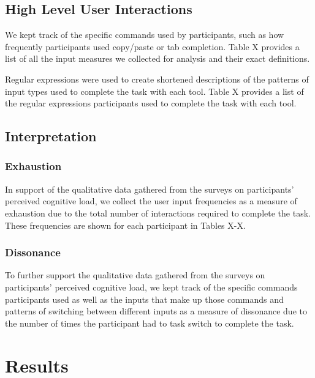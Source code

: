 \documentclass[11pt, oneside]{article}   	%
\begin{document}
\subsection{High Level User Interactions}
We kept track of the specific commands used by participants, such as how frequently participants used copy/paste or tab completion. Table X provides a list of all the input measures we collected for analysis and their exact definitions. 

Regular expressions were used to create shortened descriptions of the patterns of input types used to complete the task with each tool. Table X provides a list of the regular expressions participants used to complete the task with each tool. 

\subsection{Interpretation}
\subsubsection{Exhaustion}
In support of the qualitative data gathered from the surveys on participants' perceived cognitive load, we collect the user input frequencies as a measure of exhaustion due to the total number of interactions required to complete the task. These frequencies are shown for each participant in Tables X-X.
\subsubsection{Dissonance}
To further support the qualitative data gathered from the surveys on participants' perceived cognitive load, we kept track of the specific commands participants used as well as the inputs that make up those commands and patterns of switching between different inputs as a measure of dissonance due to the number of times the participant had to task switch to complete the task. 

\section{Results}

\end{document}
